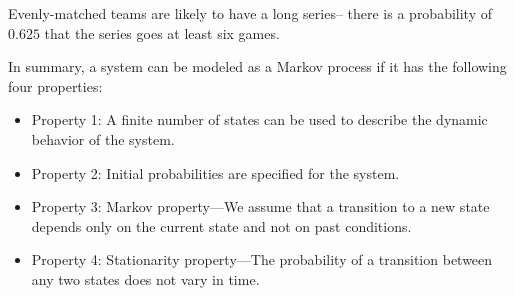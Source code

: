 \begin{center}
{}
\end{center}

Evenly-matched teams are likely to have a long series-- there
is a probability of $0.625$ that the series goes at least six games.

  In summary, a system can be modeled as a Markov process if it has the following four properties:
  \begin{itemize}
    \item Property 1: A finite number of states can be used to describe the dynamic behavior of the system.
    \item Property 2: Initial probabilities are specified for the system.
    \item Property 3: Markov property—We assume that a transition to a new state depends only on the current state and not on past conditions.
    \item Property 4: Stationarity property—The probability of a transition between any two states does not vary in time.
  \end{itemize}


